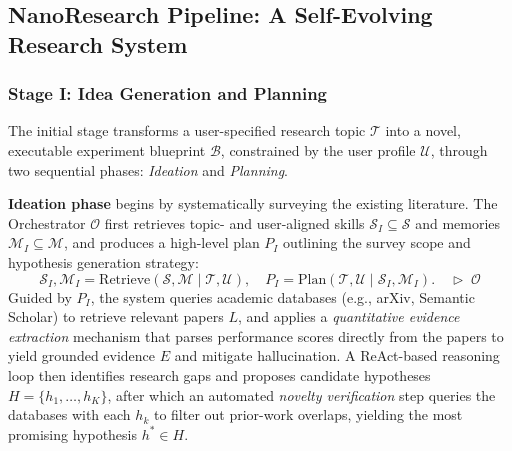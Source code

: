 \documentclass{opendatalab}
\begin{document}
\subsection{NanoResearch Pipeline: A Self-Evolving Research System}

\subsubsection{Stage I: Idea Generation and Planning}

The initial stage transforms a user-specified research topic $\mathcal{T}$ into a novel, executable experiment blueprint $\mathcal{B}$, constrained by the user profile $\mathcal{U}$, through two sequential phases: \textit{Ideation} and \textit{Planning}.

\noindent\textbf{Ideation phase} begins by systematically surveying the existing literature. The Orchestrator $\mathcal{O}$ first retrieves topic- and user-aligned skills $\mathcal{S}_I \subseteq \mathcal{S}$ and memories $\mathcal{M}_I \subseteq \mathcal{M}$, and produces a high-level plan $P_I$ outlining the survey scope and hypothesis generation strategy:
\begin{equation}
    \mathcal{S}_I, \mathcal{M}_I = \text{Retrieve}(\mathcal{S}, \mathcal{M} \mid \mathcal{T}, \mathcal{U}), \quad P_{I} = \text{Plan}(\mathcal{T}, \mathcal{U} \mid \mathcal{S}_I, \mathcal{M}_I). \quad \triangleright\;\mathcal{O}
\end{equation}
Guided by $P_{I}$, the system queries academic databases (e.g., arXiv, Semantic Scholar) to retrieve relevant papers $L$, and applies a \textit{quantitative evidence extraction} mechanism that parses performance scores directly from the papers to yield grounded evidence $E$ and mitigate hallucination. A ReAct-based reasoning loop then identifies research gaps and proposes candidate hypotheses $H = \{h_1, \dots, h_K\}$, after which an automated \textit{novelty verification} step queries the databases with each $h_k$ to filter out prior-work overlaps, yielding the most promising hypothesis $h^* \in H$.
\end{document}
